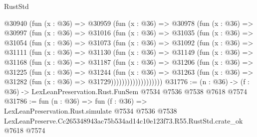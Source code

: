 \begin{lexlean}{RustStd}
\begin{coremodule}
  @30940
    (fun (x : @36) =>
    @30959
      (fun (x : @36) =>
      @30978
        (fun (x : @36) =>
        @30997
          (fun (x : @36) =>
          @31016
            (fun (x : @36) =>
            @31035
              (fun (x : @36) =>
              @31054
                (fun (x : @36) =>
                @31073
                  (fun (x : @36) =>
                  @31092
                    (fun (x : @36) =>
                    @31111
                      (fun (x : @36) =>
                      @31130
                        (fun (x : @36) =>
                        @31149
                          (fun (x : @36) =>
                          @31168
                            (fun (x : @36) =>
                            @31187
                              (fun (x : @36) =>
                              @31206
                                (fun (x : @36) =>
                                @31225
                                  (fun (x : @36) =>
                                  @31244
                                    (fun (x : @36) =>
                                    @31263
                                      (fun (x : @36) =>
                                      @31282 (fun (x : @36) => @31729)))))))))))))))))))
@31776 := (n : @36) -> (f : @36) -> LexLeanPreservation.Rust.FunSem @7534 @7536 @7538 @7618 @7574
@31786 := fun (n : @36) =>
  fun (f : @36) =>
  LexLeanPreservation.Rust.simulate
    @7534
    @7536
    @7538
    LexLeanPreserve.Cc265348943ac75b534ad14c10e123f73.R55.RustStd.crate_ok
    @7618
    @7574
\end{coremodule}
\end{lexlean}
